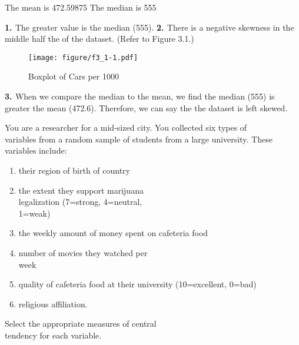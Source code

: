\documentclass[11pt]{book}\usepackage[]{graphicx}\usepackage[]{color}
\begin{document}
\begin{exercises}
\begin{solution}
    The mean is 472.59875
    The median is 555

{\bf{1. }} The greater value is the median (555).  {\bf{2. }} There is a negative skewness in the middle half the of the dataset.  (Refer to Figure 3.1.)

\begin{figure}[htbp] %
   \centering
   \texttt{[image: figure/f3\_1-1.pdf]}
   \caption{Boxplot of Cars per 1000}
   \label{fig:f3_1}
\end{figure}

{\bf{3. }} When we compare the median to the mean, we find the median (555) is greater the mean (472.6).  Therefore, we can say the the dataset is left skewed.

  \end{solution}

  \begin{exercise} %

You are a researcher for a mid-sized city. You collected six types of \\ variables from a random sample of students from a large university.  These variables include:

  \begin{enumerate}
  \item their region of birth of country
  \item the extent they support marijuana \\ legalization (7=strong, 4=neutral, \\ 1=weak)
  \item the weekly amount of money spent on cafeteria food
  \item number of movies they watched per \\ week
  \item quality of cafeteria food at their university (10=excellent, 0=bad)
  \item religious affiliation.
  \end{enumerate}

Select the  appropriate measures of central \\ tendency for each variable.




  \end{exercise}
  \begin{solution}   %


\end{solution}
\end{exercises}
\end{document}
